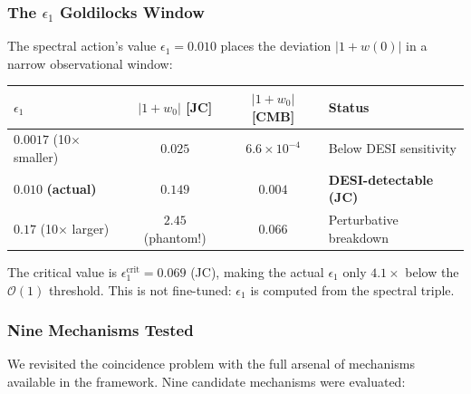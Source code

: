 \subsubsection{The $\epsilon_1$ Goldilocks Window}

The spectral action's value $\epsilon_1 = 0.010$ places the deviation $|1+w(0)|$ in a narrow observational window:

\begin{center}
\small
\begin{tabular}{l c c l}
\hline
$\epsilon_1$ & $|1+w_0|$ [JC] & $|1+w_0|$ [CMB] & Status \\
\hline
$0.0017$ (10$\times$ smaller) & $0.025$ & $6.6 \times 10^{-4}$ & Below DESI sensitivity \\
$\mathbf{0.010}$ \textbf{(actual)} & $\mathbf{0.149}$ & $\mathbf{0.004}$ & \textbf{DESI-detectable (JC)} \\
$0.17$ (10$\times$ larger) & $2.45$ (phantom!) & $0.066$ & Perturbative breakdown \\
\hline
\end{tabular}
\end{center}

\noindent
The critical value is $\epsilon_1^{\mathrm{crit}} = 0.069$ (JC), making the actual $\epsilon_1$ only $4.1\times$ below the $\mathcal{O}(1)$ threshold. This is not fine-tuned: $\epsilon_1$ is computed from the spectral triple.

\subsubsection{Nine Mechanisms Tested}

We revisited the coincidence problem with the full arsenal of mechanisms available in the framework. Nine candidate mechanisms were evaluated:

